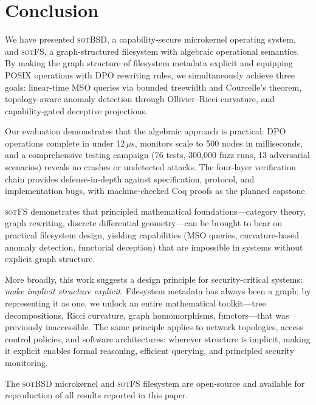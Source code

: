 \documentclass[11pt,a4paper]{article}
\theoremstyle{definition}
\theoremstyle{remark}
\newcommand{\sotfs}{\textsc{sotFS}}
\newcommand{\sotbsd}{\textsc{sotBSD}}
\begin{document}
\section{Conclusion}
\label{sec:conclusion}

We have presented \sotbsd{}, a capability-secure microkernel operating
system, and \sotfs{}, a graph-structured filesystem with algebraic
operational semantics. By making the graph structure of filesystem
metadata explicit and equipping POSIX operations with DPO rewriting
rules, we simultaneously achieve three goals: linear-time MSO queries
via bounded treewidth and Courcelle's theorem, topology-aware anomaly
detection through Ollivier--Ricci curvature, and capability-gated
deceptive projections.

Our evaluation demonstrates that the algebraic approach is practical:
DPO operations complete in under 12\,$\mu$s, monitors scale to 500
nodes in milliseconds, and a comprehensive testing campaign (76 tests,
300{,}000 fuzz runs, 13 adversarial scenarios) reveals no crashes or
undetected attacks. The four-layer verification chain provides
defense-in-depth against specification, protocol, and implementation
bugs, with machine-checked Coq proofs as the planned capstone.

\sotfs{} demonstrates that principled mathematical
foundations---category theory, graph rewriting, discrete differential
geometry---can be brought to bear on practical filesystem design,
yielding capabilities (MSO queries, curvature-based anomaly detection,
functorial deception) that are impossible in systems without explicit
graph structure.

More broadly, this work suggests a design principle for security-critical
systems: \emph{make implicit structure explicit}. Filesystem metadata
has always been a graph; by representing it as one, we unlock an entire
mathematical toolkit---tree decompositions, Ricci curvature, graph
homomorphisms, functors---that was previously inaccessible. The same
principle applies to network topologies, access control policies,
and software architectures: wherever structure is implicit, making it
explicit enables formal reasoning, efficient querying, and principled
security monitoring.

The \sotbsd{} microkernel and \sotfs{} filesystem are open-source and
available for reproduction of all results reported in this paper.
\end{document}
